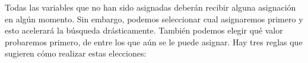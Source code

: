 Todas las variables que no han sido asignadas deberán recibir alguna asignación en algún momento.  Sin embargo, podemos seleccionar cual asignaremos primero y esto acelerará la búsqueda drásticamente.  También podemos elegir qué valor probaremos primero, de entre los que aún se le puede asignar.  Hay tres reglas que sugieren cómo realizar estas elecciones:
